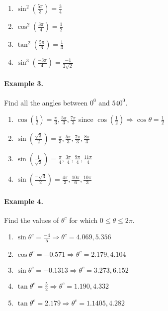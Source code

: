 \documentclass{article}
\begin{document}
\begin{enumerate}[label=\alph*)]
  \item $\sin^{2}\left( \frac{5\pi}{3} \right)=\frac{3}{4}$
  \item $\cos^{2}\left( \frac{3\pi}{4} \right)=\frac{1}{2}$
  \item $\tan^{2}\left( \frac{5\pi}{6} \right)=\frac{1}{3}$
  \item $\sin^{3}\left( \frac{-3\pi}{4} \right)=\frac{-1}{2\sqrt{2}}$
\end{enumerate}

\paragraph{Example 3.}
Find all the angles between $0^{0}$ and $540^{0}$.

\begin{enumerate}[label=\alph*)]
  \item $\cos\left(\frac{1}{2}\right) = \frac{\pi}{3}, \frac{5\pi}{3}, \frac{7\pi}{3}$ since $\cos\left(\frac{1}{2}\right) \Rightarrow \cos\theta=\frac{1}{2}$
  \item $\sin\left(\frac{\sqrt{3}}{2}\right) = \frac{\pi}{3}, \frac{5\pi}{3}, \frac{7\pi}{3}, \frac{8\pi}{3}$
  \item $\sin\left(\frac{1}{\sqrt{3}}\right) = \frac{\pi}{4}, \frac{3\pi}{4}, \frac{9\pi}{4}, \frac{11\pi}{4}$
  \item $\sin\left(\frac{-\sqrt{3}}{2}\right) = \frac{4\pi}{3}, \frac{10\pi}{6}, \frac{10\pi}{3}$
\end{enumerate}

\paragraph{Example 4.}
Find the values of $\theta^{c}$ for which $0\leq\theta\leq2\pi$.

\begin{enumerate}[label=\alph*)]
  \item $\sin\theta^{c}=\frac{-4}{5} \Rightarrow \theta^{c}=4.069, 5.356$
  \item $\cos\theta^{c}=-0.571 \Rightarrow \theta^{c}=2.179, 4.104$
  \item $\sin\theta^{c}=-0.1313 \Rightarrow \theta^{c}=3.273, 6.152$
  \item $\tan\theta^{c}=\frac{5}{2} \Rightarrow \theta^{c}=1.190, 4.332$
  \item $\tan\theta^{c}=2.179 \Rightarrow \theta^{c}=1.1405, 4.282$
\end{enumerate}
\end{document}

